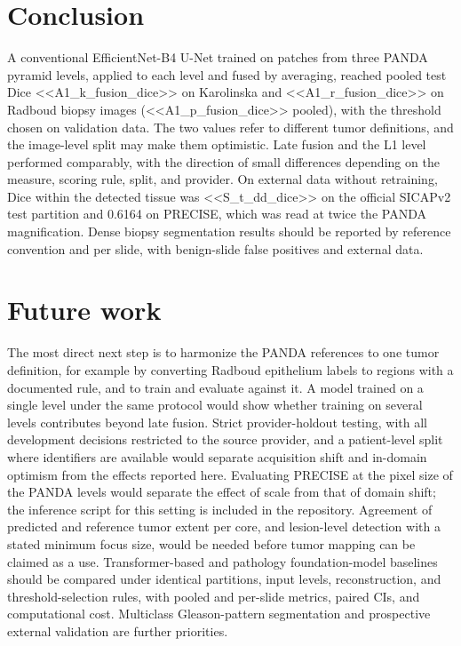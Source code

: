 \documentclass[10pt,letterpaper]{article}
\begin{document}
\section*{Conclusion}
A conventional EfficientNet-B4 U-Net trained on patches from three PANDA pyramid levels, applied to each level and fused by averaging, reached pooled test Dice <<A1_k_fusion_dice>> on Karolinska and <<A1_r_fusion_dice>> on Radboud biopsy images (<<A1_p_fusion_dice>> pooled), with the threshold chosen on validation data. The two values refer to different tumor definitions, and the image-level split may make them optimistic. Late fusion and the L1 level performed comparably, with the direction of small differences depending on the measure, scoring rule, split, and provider. On external data without retraining, Dice within the detected tissue was <<S_t_dd_dice>> on the official SICAPv2 test partition and 0.6164 on PRECISE, which was read at twice the PANDA magnification. Dense biopsy segmentation results should be reported by reference convention and per slide, with benign-slide false positives and external data.

\section*{Future work}
The most direct next step is to harmonize the PANDA references to one tumor definition, for example by converting Radboud epithelium labels to regions with a documented rule, and to train and evaluate against it. A model trained on a single level under the same protocol would show whether training on several levels contributes beyond late fusion. Strict provider-holdout testing, with all development decisions restricted to the source provider, and a patient-level split where identifiers are available would separate acquisition shift and in-domain optimism from the effects reported here. Evaluating PRECISE at the pixel size of the PANDA levels would separate the effect of scale from that of domain shift; the inference script for this setting is included in the repository. Agreement of predicted and reference tumor extent per core, and lesion-level detection with a stated minimum focus size, would be needed before tumor mapping can be claimed as a use. Transformer-based and pathology foundation-model baselines should be compared under identical partitions, input levels, reconstruction, and threshold-selection rules, with pooled and per-slide metrics, paired CIs, and computational cost. Multiclass Gleason-pattern segmentation and prospective external validation are further priorities.
\end{document}
